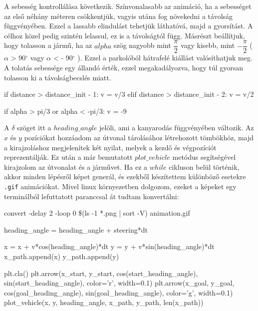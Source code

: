 \bigskip

A sebesség kontrollálása következik. Színvonalasabb az animáció, ha a sebességet az első néhány méteren csökkentjük, vagyis utána fog növekedni a távolság függvényében. Ezzel a lassabb elindulást tehetjük láthatóvá, majd a gyorsítást. A célhoz közel pedig szintén lelassul, ez is a távolságtól függ. Másrészt beállítjuk, hogy tolasson a jármű, ha az $ alpha $ szög nagyobb mint $ \dfrac{\pi}{2} $ vagy kisebb, mint $ -\dfrac{\pi}{2} $ ( $ \alpha $ > 90$^{\circ}$ vagy $ \alpha $ < - 90$^{\circ}$ ). Ezzel a parkolóból hátrafelé kiállást valósíthatjuk meg. A tolatás sebessége egy állandó érték, ezzel megakadályozva, hogy túl gyorsan tolasson ki a távolságbecslés miatt.
\begin{python}
        if distance > distance_init - 1:
            v = v/3
        elif distance > distance_init - 2:
            v = v/2

        if alpha > pi/3 or alpha < -pi/3:
            v = -9
\end{python}

\bigskip

A $ \delta $ szöget itt a $ heading\_angle $ jelöli, ami a kanyarodás függvényében változik. Az $ x $ és $ y $ pozíciókat  hozzáadom az útvonal tárolásához létrehozott tömbökhöz, majd a kirajzoláshoz megjelenítek két nyilat, melyek a kezdő és végpozíciót reprezentálják. Ez után a már bemutatott $ plot\_vehicle $ metódus segítségével kirajzolom az útvonalat és a járművet. Ha ez a $ while $ cikluson belül történik, akkor minden lépésről képet generál, és ezekből készítettem különböző esetekre \texttt{.gif} animációkat. Mivel linux környezetben dolgozom, ezeket a képeket egy terminálból lefuttatott paranccsal át tudtam konvertálni:
\begin{python}
convert -delay 2 -loop 0 \$(ls -1 *.png | sort -V) animation.gif
\end{python}

\begin{python}
heading_angle = heading_angle + steering*dt

x = x + v*cos(heading_angle)*dt
y = y + v*sin(heading_angle)*dt
x_path.append(x)
y_path.append(y)

plt.cla()
plt.arrow(x_start, y_start, cos(start_heading_angle),
          sin(start_heading_angle), color='r', width=0.1)
plt.arrow(x_goal, y_goal, cos(goal_heading_angle),
          sin(goal_heading_angle), color='g', width=0.1)
plot_vehicle(x, y, heading_angle, x_path, y_path, len(x_path))
\end{python}

